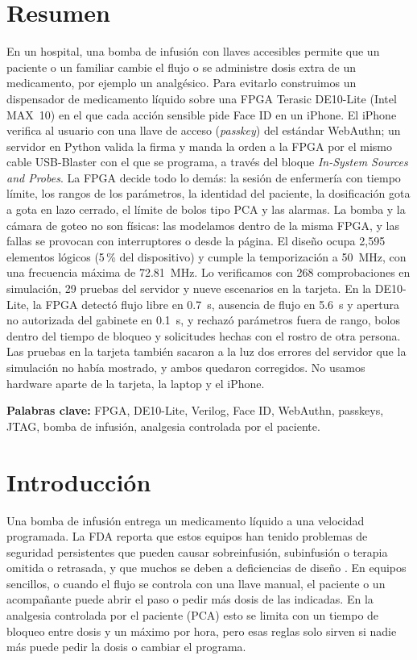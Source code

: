 \documentclass[11pt,letterpaper]{article}
\begin{document}
\section*{Resumen}
En un hospital, una bomba de infusión con llaves accesibles permite que un paciente o un familiar cambie el flujo o se administre dosis extra de un medicamento, por ejemplo un analgésico. Para evitarlo construimos un dispensador de medicamento líquido sobre una FPGA Terasic DE10-Lite (Intel MAX~10) en el que cada acción sensible pide Face ID en un iPhone. El iPhone verifica al usuario con una llave de acceso (\emph{passkey}) del estándar WebAuthn; un servidor en Python valida la firma y manda la orden a la FPGA por el mismo cable USB-Blaster con el que se programa, a través del bloque \emph{In-System Sources and Probes}. La FPGA decide todo lo demás: la sesión de enfermería con tiempo límite, los rangos de los parámetros, la identidad del paciente, la dosificación gota a gota en lazo cerrado, el límite de bolos tipo PCA y las alarmas. La bomba y la cámara de goteo no son físicas: las modelamos dentro de la misma FPGA, y las fallas se provocan con interruptores o desde la página. El diseño ocupa 2,595 elementos lógicos (5\,\% del dispositivo) y cumple la temporización a 50~MHz, con una frecuencia máxima de 72.81~MHz. Lo verificamos con 268 comprobaciones en simulación, 29 pruebas del servidor y nueve escenarios en la tarjeta. En la DE10-Lite, la FPGA detectó flujo libre en 0.7~s, ausencia de flujo en 5.6~s y apertura no autorizada del gabinete en 0.1~s, y rechazó parámetros fuera de rango, bolos dentro del tiempo de bloqueo y solicitudes hechas con el rostro de otra persona. Las pruebas en la tarjeta también sacaron a la luz dos errores del servidor que la simulación no había mostrado, y ambos quedaron corregidos. No usamos hardware aparte de la tarjeta, la laptop y el iPhone.

\textbf{Palabras clave:} FPGA, DE10-Lite, Verilog, Face ID, WebAuthn, passkeys, JTAG, bomba de infusión, analgesia controlada por el paciente.

{\setlength{\parskip}{0pt}\tableofcontents}
\newpage

\section{Introducción}
Una bomba de infusión entrega un medicamento líquido a una velocidad programada. La FDA reporta que estos equipos han tenido problemas de seguridad persistentes que pueden causar sobreinfusión, subinfusión o terapia omitida o retrasada, y que muchos se deben a deficiencias de diseño \cite{fda_pumps}. En equipos sencillos, o cuando el flujo se controla con una llave manual, el paciente o un acompañante puede abrir el paso o pedir más dosis de las indicadas. En la analgesia controlada por el paciente (PCA) esto se limita con un tiempo de bloqueo entre dosis y un máximo por hora, pero esas reglas solo sirven si nadie más puede pedir la dosis o cambiar el programa.
\end{document}

